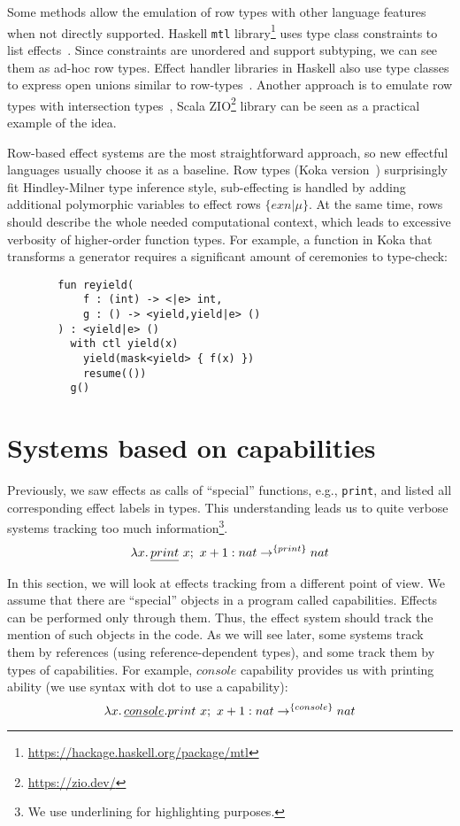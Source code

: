 \documentclass[conference]{IEEEtran}
\newcommand{\seq}{;~}
\newcommand{\ap}{~}
\begin{document}
    Some methods allow the emulation of row types with other language features when not directly supported.
    Haskell \texttt{mtl} library\footnote{\url{https://hackage.haskell.org/package/mtl}} uses type class constraints to list effects~\cite{jones1995functional}.
    Since constraints are unordered and support subtyping, we can see them as ad-hoc row types.
    Effect handler libraries in Haskell also use type classes to express open unions similar to row-types~\cite{swierstra2008data}.
    Another approach is to emulate row types with intersection types~\cite{xie2020row}, Scala ZIO\footnote{\url{https://zio.dev/}} library can be seen as a practical example of the idea.


    Row-based effect systems are the most straightforward approach, so new effectful languages usually choose it as a baseline.
    Row types (Koka version~\cite{leijen2014koka, leijen2017type}) surprisingly fit Hindley-Milner type inference style, sub-effecting is handled by adding additional polymorphic variables to effect rows $\{exn|\mu\}$.
    At the same time, rows should describe the whole needed computational context, which leads to excessive verbosity of higher-order function types.
    For example, a function in Koka that transforms a generator requires a significant amount of ceremonies to type-check:
    \begin{verbatim}
        fun reyield(
            f : (int) -> <|e> int,
            g : () -> <yield,yield|e> ()
        ) : <yield|e> ()
          with ctl yield(x)
            yield(mask<yield> { f(x) })
            resume(())
          g()
    \end{verbatim}


    \section{Systems based on capabilities} \label{sec:capabilities}

    Previously, we saw effects as calls of ``special'' functions, e.g., \texttt{print}, and listed all corresponding effect labels in types.
    This understanding leads us to quite verbose systems tracking too much information\footnote{We use underlining for highlighting purposes.}.
    \[\lambda x\ldotp \underline{print}\ap x\seq x + 1 : nat \to^{\{print\}} nat\]

    In this section, we will look at effects tracking from a different point of view.
    We assume that there are ``special'' objects in a program called capabilities.
    Effects can be performed only through them.
    Thus, the effect system should track the mention of such objects in the code.
    As we will see later, some systems track them by references (using reference-dependent types), and some track them by types of capabilities.
    For example, $console$ capability provides us with printing ability (we use syntax with dot to use a capability):
    \[\lambda x\ldotp \underline{console}.print\ap x\seq x + 1 : nat \to^{\{console\}} nat\]
\end{document}
